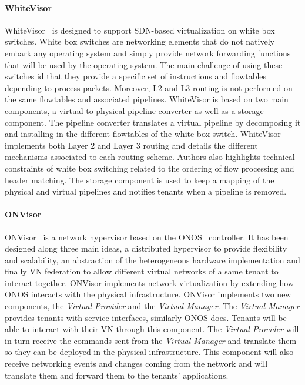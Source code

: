 \paragraph{WhiteVisor}
WhiteVisor~\cite{whitevisor-Yu2019} is designed to support SDN-based virtualization on white box switches.
White box switches are networking elements that do not natively embark any operating system and simply provide network forwarding functions that will be used by the operating system.  
The main challenge of using these switches id that they provide a specific set of instructions and flowtables depending to process packets. Moreover, L2 and L3 routing is not performed on the same flowtables and associated pipelines.
WhiteVisor is based on two main components, a virtual to physical pipeline converter as well as a storage component.
The pipeline converter translates a virtual pipeline by decomposing it and installing in the different flowtables of the white box switch. WhiteVisor implements both Layer 2 and Layer 3 routing and details the different mechanisms associated to each routing scheme. Authors also highlights technical constraints of white box switching related to the ordering of flow processing and header matching. The storage component is used to keep a mapping of the physical and virtual pipelines and notifies tenants when a pipeline is removed. 


\paragraph{ONVisor}
ONVisor~\cite{ONVisor-Han2018} is a network hypervisor based on the ONOS~\cite{onos-Berde2014a} controller.
It has been designed along three main ideas, a distributed hypervisor to provide flexibility and scalability, an abstraction of the heterogeneous hardware implementation and finally VN federation to allow different virtual networks of a same tenant to interact together.
ONVisor implements network virtualization by extending how ONOS interacts with the physical infrastructure.
ONVisor implements two new components, the \textit{Virtual Provider} and the \textit{Virtual Manager}.
The \textit{Virtual Manager} provides tenants with service interfaces, similarly ONOS does. Tenants will be able to interact with their VN through this component.
The \textit{Virtual Provider} will in turn receive the commands sent from the \textit{Virtual Manager} and translate them so they can be deployed in the physical infrastructure. This component will also receive networking events and changes coming from the network and will translate them and forward them to the tenants' applications.

